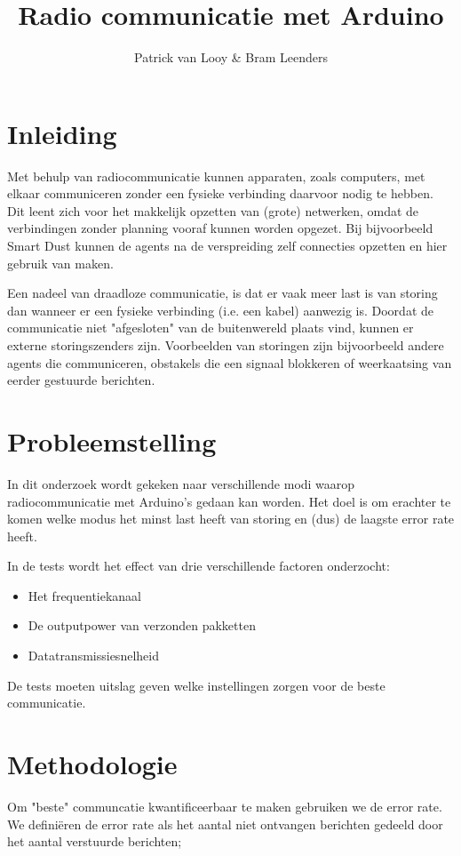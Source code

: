 \documentclass[a4paper,10pt]{article}
\title{Radio communicatie met Arduino}
\author{Patrick van Looy \& Bram Leenders}
\begin{document}
\maketitle

\section{Inleiding}
Met behulp van radiocommunicatie kunnen apparaten, zoals computers, met elkaar communiceren zonder een fysieke verbinding daarvoor nodig te hebben. Dit leent zich voor het makkelijk opzetten van (grote) netwerken, omdat de verbindingen zonder planning vooraf kunnen worden opgezet. Bij bijvoorbeeld Smart Dust kunnen de agents na de verspreiding zelf connecties opzetten en hier gebruik van maken.

Een nadeel van draadloze communicatie, is dat er vaak meer last is van storing dan wanneer er een fysieke verbinding (i.e. een kabel) aanwezig is. Doordat de communicatie niet "afgesloten" van de buitenwereld plaats vind, kunnen er externe storingszenders zijn. Voorbeelden van storingen zijn bijvoorbeeld andere agents die communiceren, obstakels die een signaal blokkeren of weerkaatsing van eerder gestuurde berichten.

\section{Probleemstelling}
In dit onderzoek wordt gekeken naar verschillende modi waarop radiocommunicatie met Arduino's gedaan kan worden. Het doel is om erachter te komen welke modus het minst last heeft van storing en (dus) de laagste error rate heeft.

In de tests wordt het effect van drie verschillende factoren onderzocht:
\begin{itemize}
	\item Het frequentiekanaal
	\item De outputpower van verzonden pakketten
	\item Datatransmissiesnelheid
\end{itemize}

De tests moeten uitslag geven welke instellingen zorgen voor de beste communicatie.

\section{Methodologie}
Om "beste" communcatie kwantificeerbaar te maken gebruiken we de error rate. We defini\"eren de error rate als het aantal niet ontvangen berichten gedeeld door het aantal verstuurde berichten;
\end{document}
